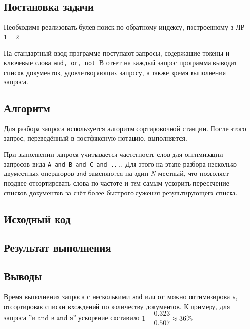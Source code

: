 \documentclass[a4paper, 12pt]{article}
\begin{document}

\newpage


\subsection*{Постановка задачи}
Необходимо реализовать булев поиск по обратному индексу, построенному в ЛР 1 -- 2.

На стандартный ввод программе поступают запросы, содержащие токены и ключевые слова {\tt and, or, not}. В ответ на каждый запрос программа выводит список документов, удовлетворяющих запросу, а также время выполнения запроса.


\subsection*{Алгоритм}
Для разбора запроса используется алгоритм сортировочной станции. После этого запрос, переведённый в постфиксную нотацию, выполняется.

При выполнении запроса учитывается частотность слов для оптимизации запросов вида {\tt A and B and C and ...}. Для этого на этапе разбора несколько двуместных операторов {\tt and} заменяются на один $N$-местный, что позволяет позднее отсортировать слова по частоте и тем самым ускорить пересечение списков документов за счёт более быстрого сужения результирующего списка.


\subsection*{Исходный код}



\newpage
\subsection*{Результат выполнения}



\subsection*{Выводы}
Время выполнения запроса с несколькими {\tt and} или {\tt or} можно оптимизировать, отсортировав списки вхождений по количеству документов. К примеру, для запроса ''и and в and я'' ускорение составило $1 - \dfrac{0.323}{0.507} \approx 36\%$.
\end{document}
